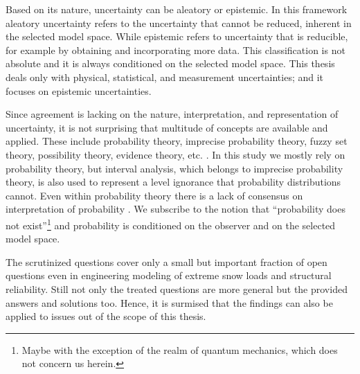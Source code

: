 Based on its nature, uncertainty can be aleatory or epistemic. In this framework aleatory uncertainty refers to the uncertainty that cannot be reduced, inherent in the selected model space. While epistemic refers to uncertainty that is reducible, for example by obtaining and incorporating more data. This classification is not absolute and it is always conditioned on the selected model space. 
This thesis deals only with physical, statistical, and measurement uncertainties; and it focuses on epistemic uncertainties.

Since agreement is lacking on the nature, interpretation, and representation of uncertainty, it is not surprising that multitude of concepts are available and applied. These include probability theory, imprecise probability theory, fuzzy set theory, possibility theory, evidence theory, etc. \citep{Corotis2015, Ayyub2006}. In this study we mostly rely on probability theory, but interval analysis, which belongs to imprecise probability theory, is also used to represent a level ignorance that probability distributions cannot. Even within probability theory there is a lack of consensus on interpretation of probability \citep{Hajek2012}. We subscribe to the notion that ``probability does not exist''\footnote{Maybe with the exception of the realm of quantum mechanics, which does not concern us herein.} \citep{Finetti1974} and probability is conditioned on the observer and on the selected model space.

The scrutinized questions cover only a small but important fraction of open questions even in engineering modeling of extreme snow loads and structural reliability. Still not only the treated questions are more general but the provided answers and solutions too. Hence, it is surmised that the findings can also be applied to issues out of the scope of this thesis.


